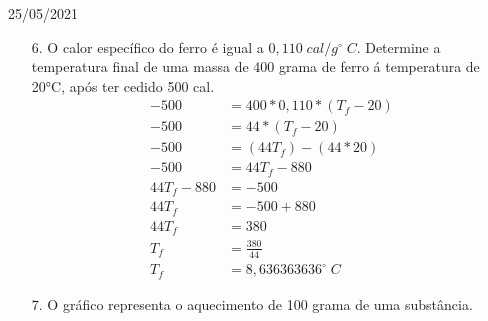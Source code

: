 \documentclass{SchoolBook}
\begin{document}
    \begin{day}{25/05/2021}
        \begin{enumerate}
            \item[6.] O calor específico do ferro é igual a $ 0,110\;cal/g^\circ\;C $. Determine a temperatura final de uma massa de 400 grama de ferro á temperatura de 20°C, após ter cedido 500 cal.
            \begin{align*}
                        -500 &= 400 * 0,110 * (T_f - 20) \\
                        -500 &= 44 * (T_f - 20)          \\
                        -500 &= (44 T_f) - (44 * 20)     \\
                        -500 &= 44 T_f - 880             \\
                44 T_f - 880 &= -500                     \\
                      44 T_f &= -500 + 880               \\
                      44 T_f &= 380                      \\
                         T_f &= \frac{380}{44}           \\
                         T_f &= 8,636363636^\circ\;C
            \end{align*}
            
            \item[7.] O gráfico representa o aquecimento de 100 grama de uma substância.
            

\end{enumerate}
\end{day}
\end{document}
